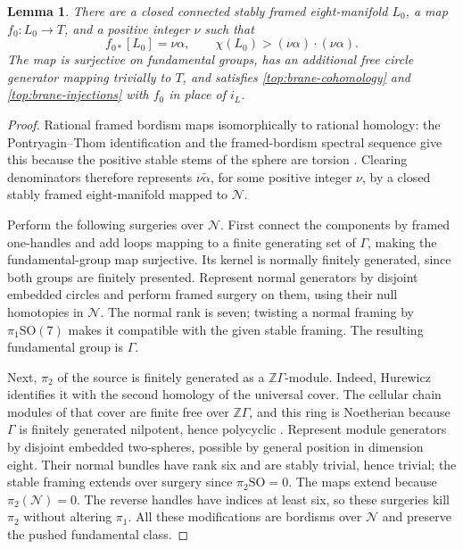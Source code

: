 \documentclass[11pt]{article}
\newtheorem{lemma}[theorem]{Lemma}
\theoremstyle{definition}
\theoremstyle{remark}
\newcommand{\Z}{\mathbb Z}
\numberwithin{equation}{section}
\begin{document}
\begin{lemma}\label{top:framed-source}
There are a closed connected stably framed eight-manifold $L_0$, a map
$f_0:L_0\to T$, and a positive integer $\nu$ such that
\[
 f_{0*}[L_0]=\nu\alpha,\qquad
 \chi(L_0)>(\nu\alpha)\cdot(\nu\alpha).
\]
The map is surjective on fundamental groups, has an additional free
circle generator mapping trivially to $T$, and satisfies
\eqref{top:brane-cohomology} and \eqref{top:brane-injections} with
$f_0$ in place of $i_L$.
\end{lemma}

\begin{proof}
Rational framed bordism maps isomorphically to rational homology: the
Pontryagin--Thom identification and the framed-bordism spectral sequence
give this because the positive stable stems of the sphere are torsion
\cite[proof of Proposition~3.1]{framed-rational}.  Clearing denominators
therefore represents $\nu\widetilde\alpha$, for some positive integer
$\nu$, by a closed stably framed eight-manifold mapped to $\mathcal N$.

Perform the following surgeries over $\mathcal N$.  First connect the
components by framed one-handles and add loops mapping to a finite
generating set of $\Gamma$, making the fundamental-group map
surjective.  Its kernel is normally finitely generated, since both
groups are finitely presented.  Represent normal generators by disjoint
embedded circles and perform framed surgery on them, using their null
homotopies in $\mathcal N$.  The normal rank is seven; twisting a
normal framing by $\pi_1\mathrm{SO}(7)$ makes it compatible with the
given stable framing.  The resulting fundamental group is $\Gamma$.

Next, $\pi_2$ of the source is finitely generated as a
$\Z\Gamma$-module.  Indeed, Hurewicz identifies it with the second
homology of the universal cover.  The cellular chain modules of that
cover are finite free over $\Z\Gamma$, and this ring is Noetherian
because $\Gamma$ is finitely generated nilpotent, hence polycyclic
\cite{hall}.  Represent module generators by disjoint embedded
two-spheres, possible by general position in dimension eight.  Their
normal bundles have rank six and are stably trivial, hence trivial;
the stable framing extends over surgery since $\pi_2\mathrm{SO}=0$.
The maps extend because $\pi_2(\mathcal N)=0$.  The reverse handles
have indices at least six, so these surgeries kill $\pi_2$ without
altering $\pi_1$.  All these modifications are bordisms over
$\mathcal N$ and preserve the pushed fundamental class.


\end{proof}
\end{document}
